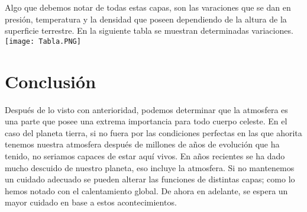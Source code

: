 \documentclass{article}
\begin{document}
Algo que debemos notar de todas estas capas, son las varaciones que se dan en presión, temperatura y la densidad que poseen dependiendo de la altura de la superficie terrestre. En la siguiente tabla se muestran determinadas variaciones.\\

\texttt{[image: Tabla.PNG]}

\newpage

\section{\Huge Conclusión}
Después de lo visto con anterioridad, podemos determinar que la atmosfera es una parte que posee una extrema importancia para todo cuerpo celeste. En el caso del planeta tierra, si no fuera por las condiciones perfectas en las que ahorita tenemos nuestra atmosfera después de millones de años de evolución que ha tenido, no seriamos capaces de estar aquí vivos. En años recientes se ha dado mucho descuido de nuestro planeta, eso incluye la atmosfera. Si no mantenemos un cuidado adecuado se pueden alterar las funciones de distintas capas; como lo hemos notado con el calentamiento global. De ahora en adelante, se espera un mayor cuidado en base a estos acontecimientos.
\end{document}
